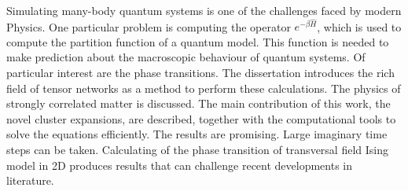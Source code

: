Simulating many-body quantum systems is one of the challenges faced by modern Physics. One particular problem is computing the operator $e^{-\beta \hat{H}}$, which is used to compute the partition function of a quantum model.  This function is needed to make prediction about the macroscopic behaviour of quantum systems. Of particular interest are the phase transitions. The dissertation introduces the rich field of tensor networks as a method to perform these calculations. The physics of strongly correlated matter is discussed. The main contribution of this work, the novel cluster expansions, are described, together with the computational tools to solve the equations efficiently. The results are promising. Large imaginary time steps can be taken. Calculating of the phase transition of transversal field Ising model in 2D produces results that can challenge recent developments in literature.

